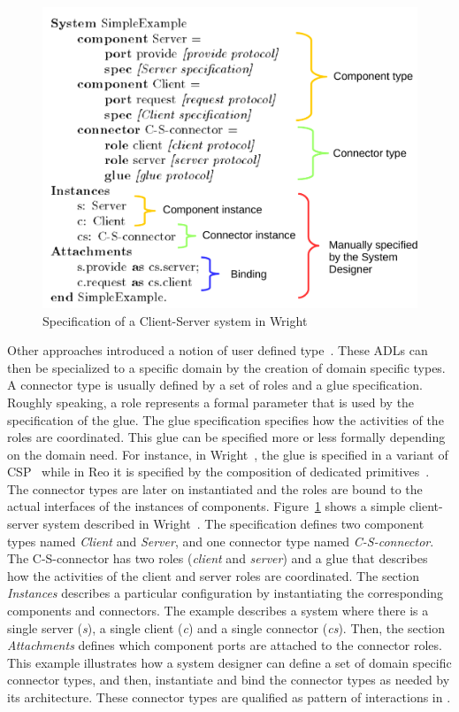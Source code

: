 			
			\begin{figure}
				\begin{center}
					\includegraphics[width=0.5\columnwidth]{background/figs/wrightspec}
					\caption{Specification of a Client-Server system in Wright~\cite{wrightbib}}
					\label{fig:wrightspec}
				\end{center}
			\end{figure}
			
Other approaches introduced a notion of user defined type~\cite{uniconbib,wrightbib,reobib}. These ADLs can then be specialized to a specific domain by the creation of domain specific types. A connector type is usually defined by a set of roles and a glue specification. Roughly speaking, a role represents a formal parameter that is used by the specification of the glue. The glue specification specifies how the activities of the roles are coordinated. This glue can be specified more or less formally depending on the domain need. For instance, in Wright~\cite{wrightbib}, the glue is specified in a variant of CSP~\cite{csphoarebib} while in Reo it is specified by the composition of dedicated primitives~\cite{reobib}. The connector types are later on instantiated and the roles are bound to the actual interfaces of the instances of components. Figure~\ref{fig:wrightspec} shows a simple client-server system described in Wright~\cite{wrightbib}. The specification defines two component types named \emph{Client} and \emph{Server}, and one connector type named \emph{C-S-connector}. The C-S-connector has two roles (\emph{client} and \emph{server}) and a glue that describes how the activities of the client and server roles are coordinated. The section \emph{Instances} describes a particular configuration by instantiating the corresponding components and connectors. The example describes a system where there is a single server (\emph{s}), a single client (\emph{c}) and a single connector (\emph{cs}). Then, the section \emph{Attachments} defines which component ports are attached to the connector roles. This example illustrates how a system designer can define a set of domain specific connector types, and then, instantiate and bind the connector types as needed by its architecture. These connector types are qualified as pattern of interactions in \cite{wrightbib}. 
			

